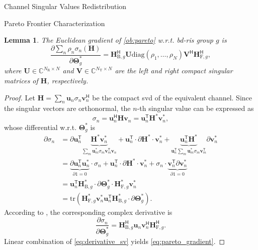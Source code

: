 \documentclass[journal]{IEEEtran}
\newtheorem{lemma}{Lemma}
\begin{document}
\begin{section}{Channel Singular Values Redistribution}
\begin{subsection}{Pareto Frontier Characterization}
		\begin{lemma}\label{lm:pareto_gradient}
			The Euclidean gradient of \eqref{ob:pareto} w.r.t. \gls{bd}-\gls{ris} group $g$ is
			\begin{equation}
				\frac{\partial \sum_n \rho_n \sigma_n(\mathbf{H})}{\partial \mathbf{\Theta}_g^*} = \mathbf{H}_{\mathrm{B},g}^\mathsf{H} \mathbf{U} \mathrm{diag}(\rho_1,\ldots,\rho_N) \mathbf{V}^\mathsf{H} \mathbf{H}_{\mathrm{F},g}^\mathsf{H},
				\label{eq:pareto_gradient}
			\end{equation}
			where $\mathbf{U} \in \mathbb{C}^{N_\mathrm{R} \times N}$ and $\mathbf{V} \in \mathbb{C}^{N_\mathrm{T} \times N}$ are the left and right compact singular matrices of $\mathbf{H}$, respectively.
		\end{lemma}
		\begin{proof}
			Let $\mathbf{H} = \sum_n \mathbf{u}_n \sigma_n \mathbf{v}_n^\mathsf{H}$ be the compact \gls{svd} of the equivalent channel.
			Since the singular vectors are orthonormal, the $n$-th singular value can be expressed as
			\begin{equation}
				\sigma_n = \mathbf{u}_n^\mathsf{H} \mathbf{H} \mathbf{v}_n = \mathbf{u}_n^\mathsf{T} \mathbf{H}^* \mathbf{v}_n^*,
			\end{equation}
			whose differential w.r.t. $\mathbf{\Theta}_g^*$ is
			\begin{align*}
				\partial \sigma_n
				& = \partial \mathbf{u}_n^\mathsf{T} \underbrace{\mathbf{H}^* \mathbf{v}_n^*}_{\sum_m \mathbf{u}_m^* \sigma_m \mathbf{v}_m^\mathsf{T} \mathbf{v}_n} + \mathbf{u}_n^\mathsf{T} \cdot \partial \mathbf{H}^* \cdot \mathbf{v}_n^* + \underbrace{\mathbf{u}_n^\mathsf{T} \mathbf{H}^*}_{\mathbf{u}_n^\mathsf{T} \sum_m \mathbf{u}_m^* \sigma_m \mathbf{v}_m^\mathsf{T}} \partial \mathbf{v}_n^*\\
				& = \underbrace{\partial \mathbf{u}_n^\mathsf{T} \mathbf{u}_n^*}_{\partial 1 = 0} \cdot \sigma_n + \mathbf{u}_n^\mathsf{T} \cdot \partial \mathbf{H}^* \cdot \mathbf{v}_n^* + \sigma_n \cdot \underbrace{\mathbf{v}_n^\mathsf{T} \partial \mathbf{v}_n^*}_{\partial 1 = 0}\\
				& = \mathbf{u}_n^\mathsf{T} \mathbf{H}_{\mathrm{B},g}^* \cdot \partial \mathbf{\Theta}_g^* \cdot \mathbf{H}_{\mathrm{F},g}^* \mathbf{v}_n^*\\
				& = \mathrm{tr}(\mathbf{H}_{\mathrm{F},g}^* \mathbf{v}_n^*\mathbf{u}_n^\mathsf{T} \mathbf{H}_{\mathrm{B},g}^* \cdot \partial \mathbf{\Theta}_g^*).
			\end{align*}
			According to \cite{Hjorungnes2007}, the corresponding complex derivative is
			\begin{equation}
				\frac{\partial \sigma_n}{\partial \mathbf{\Theta}_g^*} = \mathbf{H}_{\mathrm{B},g}^\mathsf{H} \mathbf{u}_n \mathbf{v}_n^\mathsf{H} \mathbf{H}_{\mathrm{F},g}^\mathsf{H}.
				\label{eq:derivative_sv}
			\end{equation}
			Linear combination of \eqref{eq:derivative_sv} yields \eqref{eq:pareto_gradient}.
		\end{proof}


\end{subsection}
\end{section}
\end{document}
